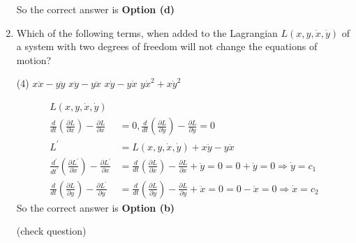 \begin{enumerate}
\begin{answer}
		So the correct answer is \textbf{Option (d)}
\end{answer}
\item Which of the following terms, when added to the Lagrangian $L(x, y, \dot{x}, \dot{y})$ of a system with two degrees of freedom will not change the equations of motion?
 \begin{tasks}(4)
	\task[\textbf{a.}]$x \ddot{x}-y \ddot{y}$
	\task[\textbf{b.}]$x \ddot{y}-y \ddot{x}$
	\task[\textbf{c.}]$x \dot{y}-y \dot{x}$
	\task[\textbf{d.}] $y \dot{x}^{2}+x \dot{y}^{2}$
\end{tasks}
\begin{answer}
	\begin{align*}
	L(x, y, \dot{x}, \dot{y})&\\
	\frac{d}{d t}\left(\frac{\partial L}{\partial \dot{x}}\right)-\frac{\partial L}{\partial x}&=0, \frac{d}{d t}\left(\frac{\partial L}{\partial \dot{y}}\right)-\frac{\partial L}{\partial y}=0 \\
	L^{\prime}&=L(x, y, \dot{x}, \dot{y})+x \ddot{y}-y \ddot{x} \\
	\frac{d^{\prime}}{d t^{\prime}}\left(\frac{\partial L^{\prime}}{\partial \dot{x}}\right)-\frac{\partial L^{\prime}}{\partial x}&=\frac{d}{d t}\left(\frac{\partial L}{\partial \dot{x}}\right)-\frac{\partial L}{\partial x}+\ddot{y}=0=0+\ddot{y}=0 \Rightarrow \dot{y}=c_{1} \\
	\frac{d}{d t}\left(\frac{\partial L}{\partial y}\right)-\frac{\partial L^{\prime}}{\partial y}&=\frac{d}{d t}\left(\frac{\partial L}{\partial \dot{y}}\right)-\frac{\partial L}{\partial y}+\ddot{x}=0=0-\ddot{x}=0 \Rightarrow \dot{x}=c_{2}
	\end{align*}
	So the correct answer is \textbf{Option (b)}
\end{answer}
(check question)	

\end{enumerate}
